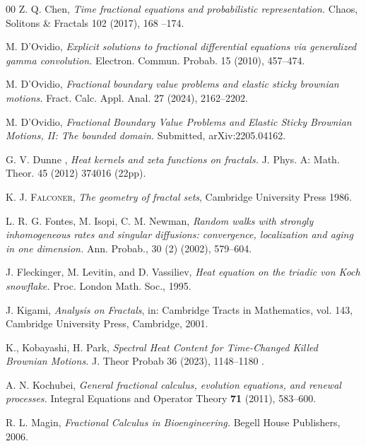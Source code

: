 \documentclass[[11pt,a4paper,reqno]{article}
\numberwithin{equation}{section}
\begin{document}
{\begin{thebibliography}{00}
{\sc Z. Q. Chen,}
\emph{Time fractional equations and probabilistic representation.}
Chaos, Solitons \& Fractals 102 (2017),  168 --174.

{\sc  M. D'Ovidio},
\emph{Explicit solutions to fractional differential equations via generalized gamma convolution.} Electron. Commun. Probab. 15 (2010), 457--474. 

 
 {\sc M. D'Ovidio}, 
\emph{Fractional boundary value problems and elastic sticky brownian motions.} 
Fract. Calc. Appl. Anal. 27 (2024), 2162--2202.


 {\sc M. D'Ovidio}, 
\emph{Fractional Boundary Value Problems and Elastic Sticky Brownian Motions, II: The bounded domain.} Submitted, arXiv:2205.04162.


 {\sc  G. V. Dunne },   \emph{Heat kernels and zeta functions on fractals.}  J. Phys. A: Math. Theor. 45 (2012) 374016 (22pp).



\textsc{{K. J. Falconer}},
\emph{The geometry of fractal sets}, Cambridge University Press 1986.

  {\sc  L. R. G. Fontes,  M. Isopi,  C. M. Newman},
\emph{ Random walks with strongly inhomogeneous rates and singular diffusions: convergence, localization and aging in one dimension.}
Ann. Probab., 30 (2) (2002), 579--604.

  {\sc J. Fleckinger, M. Levitin, and D. Vassiliev,} \emph{Heat equation on the triadic von Koch snowflake.} Proc. London Math. Soc., 1995.



    {\sc J. Kigami,}  \emph{Analysis on Fractals}, in: Cambridge Tracts in Mathematics, vol. 143, Cambridge University Press, Cambridge, 2001.


 {\sc  K., Kobayashi, H. Park,} \emph{Spectral Heat Content for Time-Changed Killed Brownian Motions.} J.  Theor Probab 36 (2023), 1148--1180 . 


{\sc A. N. Kochubei,} 
\textit{General fractional calculus, evolution equations, and renewal processes.} 
Integral Equations and Operator Theory \textbf{71} (2011), 583--600.



  {\sc R. L. Magin,} \textit{Fractional Calculus in Bioengineering.} Begell House Publishers, 2006.





\end{thebibliography}}
\end{document}
